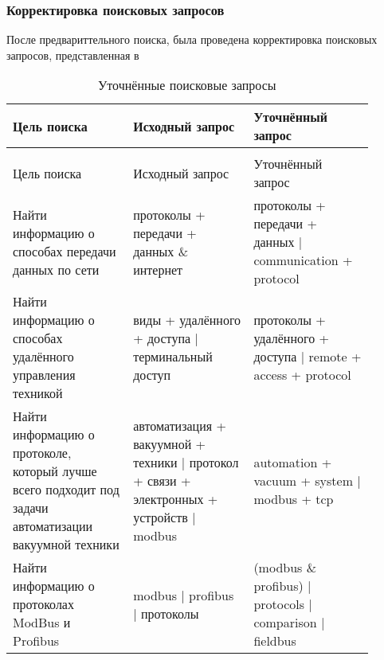 \subsubsection{Корректировка поисковых запросов}
После предвариттельного поиска, была проведена корректировка поисковых запросов, представленная в 
\begin{center}
	\begin{longtable}{|C{0.3\linewidth}|C{0.3\linewidth}|C{0.3\linewidth}|}
		\caption{Уточнённые поисковые запросы}
		\label{tab:search_corrected}\\
		\hline
		\bfseries  Цель поиска &\bfseries Исходный запрос& \bfseries Уточнённый запрос\\
		\endfirsthead
		\cpt\\
		\hline
		Цель поиска& Исходный запрос & Уточнённый запрос\\
		\endhead
		\hline
		Найти информацию о способах передачи данных по сети &протоколы + передачи + данных \& интернет& протоколы + передачи + данных | communication + protocol\\
		\hline
		Найти информацию о способах удалённого управления техникой&виды + удалённого + доступа | терминальный доступ&протоколы + удалённого + доступа | remote + access + protocol\\
		\hline
		Найти информацию о протоколе, который лучше всего подходит под задачи автоматизации вакуумной техники & автоматизация + вакуумной + техники | протокол + связи + электронных + устройств | modbus& automation + vacuum + system | modbus + tcp\\		
		\hline
		Найти информацию о протоколах ModBus и Profibus & modbus | profibus | протоколы  & (modbus \& profibus) | protocols | comparison | fieldbus\\
		\hline
	\end{longtable}
\end{center}